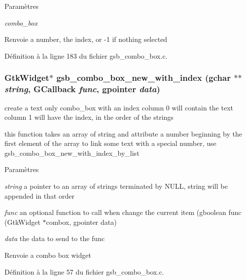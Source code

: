 \begin{DoxyParams}{Paramètres}
\item[{\em combo\_\-box}]\end{DoxyParams}
\begin{DoxyReturn}{Renvoie}
a number, the index, or -\/1 if nothing selected 
\end{DoxyReturn}


Définition à la ligne 183 du fichier gsb\_\-combo\_\-box.c.

\subsubsection[{gsb\_\-combo\_\-box\_\-new\_\-with\_\-index}]{\setlength{\rightskip}{0pt plus 5cm}GtkWidget$\ast$ gsb\_\-combo\_\-box\_\-new\_\-with\_\-index (gchar $\ast$$\ast$ {\em string}, \/  GCallback {\em func}, \/  gpointer {\em data})}\label{gsb__combo__box_8c_a23f4b26bf92de4ed5e6997ab265b3bdc}
create a text only combo\_\-box with an index column 0 will contain the text column 1 will have the index, in the order of the strings

this function takes an array of string and attribute a number beginning by the first element of the array to link some text with a special number, use gsb\_\-combo\_\-box\_\-new\_\-with\_\-index\_\-by\_\-list


\begin{DoxyParams}{Paramètres}
\item[{\em string}]a pointer to an array of strings terminated by NULL, string will be appended in that order \item[{\em func}]an optional function to call when change the current item (gboolean func (GtkWidget $\ast$combox, gpointer data) \item[{\em data}]the data to send to the func\end{DoxyParams}
\begin{DoxyReturn}{Renvoie}
a combo box widget 
\end{DoxyReturn}


Définition à la ligne 57 du fichier gsb\_\-combo\_\-box.c.

